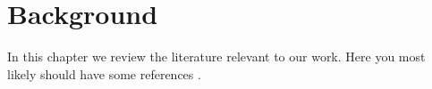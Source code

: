 \chapter{Background}

In this chapter we review the literature relevant to our work. 
Here you most likely should have some references \cite{Tol-JoBN-1957}. 

